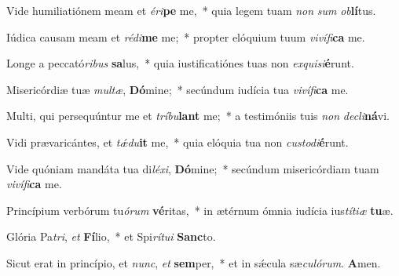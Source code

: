 \item Vide humiliatiónem meam et \textit{éri}\textbf{pe} me,~* quia legem tuam \textit{non} \textit{sum} \textit{ob}\textbf{lí}tus.

\item Iúdica causam meam et \textit{rédi}\textbf{me} me;~* propter elóquium tuum \textit{vivífi}\textbf{ca} me.

\item Longe a peccató\textit{ribus} \textbf{sa}lus,~* quia iustificatiónes tuas non \textit{exquisi}\textbf{é}runt.

\item Misericórdiæ tuæ \textit{multæ}, \textbf{Dó}mine;~* secúndum iudícia tua \textit{vivífi}\textbf{ca} me.

\item Multi, qui persequúntur me et \textit{tríbu}\textbf{lant} me;~* a testimóniis tuis \textit{non} \textit{decli}\textbf{ná}vi.

\item Vidi prævaricántes, et \textit{tǽdu}\textbf{it} me,~* quia elóquia tua non \textit{custodi}\textbf{é}runt.

\item Vide quóniam mandáta tua di\textit{léxi}, \textbf{Dó}mine;~* secúndum misericórdiam tuam \textit{vivífi}\textbf{ca} me.

\item Princípium verbórum tu\textit{órum} \textbf{vé}ritas,~* in ætérnum ómnia iudícia ius\textit{títiæ} \textbf{tu}æ.

\item Glória Pa\textit{tri}, \textit{et} \textbf{Fí}lio,~* et Spi\textit{rítui} \textbf{Sanc}to.

\item Sicut erat in princípio, et \textit{nunc}, \textit{et} \textbf{sem}per,~* et in sǽcula sæ\textit{culórum}. \textbf{A}men.